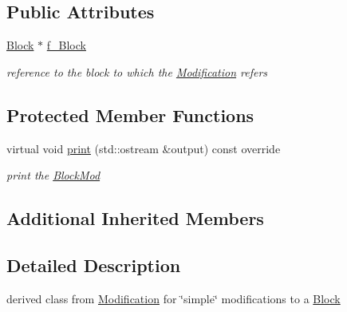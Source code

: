 \subsection*{Public Attributes}
\begin{DoxyCompactItemize}
\item 
\mbox{\label{class_s_m_spp__di__unipi__it_1_1_block_mod_a372d458e214710b23cf375b9a6edc5fc}} 
\mbox{\hyperlink{class_s_m_spp__di__unipi__it_1_1_block}{Block}} $\ast$ \mbox{\hyperlink{class_s_m_spp__di__unipi__it_1_1_block_mod_a372d458e214710b23cf375b9a6edc5fc}{f\+\_\+\+Block}}
\begin{DoxyCompactList}\small\item\em reference to the block to which the \mbox{\hyperlink{class_s_m_spp__di__unipi__it_1_1_modification}{Modification}} refers \end{DoxyCompactList}\end{DoxyCompactItemize}
\subsection*{Protected Member Functions}
\begin{DoxyCompactItemize}
\item 
\mbox{\label{class_s_m_spp__di__unipi__it_1_1_block_mod_a59a9fcbf8f9f86d348344b2073644b0e}} 
virtual void \mbox{\hyperlink{class_s_m_spp__di__unipi__it_1_1_block_mod_a59a9fcbf8f9f86d348344b2073644b0e}{print}} (std\+::ostream \&output) const override
\begin{DoxyCompactList}\small\item\em print the \mbox{\hyperlink{class_s_m_spp__di__unipi__it_1_1_block_mod}{Block\+Mod}} \end{DoxyCompactList}\end{DoxyCompactItemize}
\subsection*{Additional Inherited Members}


\subsection{Detailed Description}
derived class from \mbox{\hyperlink{class_s_m_spp__di__unipi__it_1_1_modification}{Modification}} for \char`\"{}simple\char`\"{} modifications to a \mbox{\hyperlink{class_s_m_spp__di__unipi__it_1_1_block}{Block}} 

